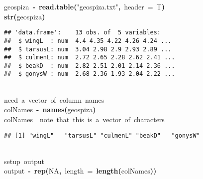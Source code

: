\documentclass{article}\usepackage{graphicx, color}
\makeatletter
\newcommand{\hlnumber}[1]{\textcolor[rgb]{0,0,0}{#1}}%
\newcommand{\hlfunctioncall}[1]{\textcolor[rgb]{0.501960784313725,0,0.329411764705882}{\textbf{#1}}}%
\newcommand{\hlstring}[1]{\textcolor[rgb]{0.6,0.6,1}{#1}}%
\newcommand{\hlkeyword}[1]{\textcolor[rgb]{0,0,0}{\textbf{#1}}}%
\newcommand{\hlargument}[1]{\textcolor[rgb]{0.690196078431373,0.250980392156863,0.0196078431372549}{#1}}%
\newcommand{\hlcomment}[1]{\textcolor[rgb]{0.180392156862745,0.6,0.341176470588235}{#1}}%
\newcommand{\hlassignement}[1]{\textcolor[rgb]{0,0,0}{\textbf{#1}}}%
\newcommand{\hlsymbol}[1]{\textcolor[rgb]{0,0,0}{#1}}%
\newcommand{\hlstd}[1]{\textcolor[rgb]{0,0,0}{#1}}%
\newenvironment{kframe}{%
 \def\FrameCommand##1{\hskip\@totalleftmargin \hskip-\fboxsep
 \colorbox{shadecolor}{##1}\hskip-\fboxsep
     \hskip-\linewidth \hskip-\@totalleftmargin \hskip\columnwidth}%
 \MakeFramed {\advance\hsize-\width
   \@totalleftmargin\z@ \linewidth\hsize
   \@setminipage}}%
 {\par\unskip\endMakeFramed}
\newenvironment{knitrout}{}{} %
\makeatother
\begin{document}
\begin{knitrout}
\color{fgcolor}\begin{kframe}
\begin{flushleft}
\ttfamily\noindent
\hlsymbol{geospiza}{\ }\hlassignement{\usebox{\hlnormalsizeboxlessthan}-}{\ }\hlfunctioncall{read.table}\hlkeyword{(}\hlstring{"{}{}geospiza.txt"{}{}}\hlkeyword{,}{\ }\hlargument{header}{\ }\hlargument{=}{\ }\hlsymbol{T}\hlkeyword{)}\hspace*{\fill}\\
\hlstd{}\hlfunctioncall{str}\hlkeyword{(}\hlsymbol{geospiza}\hlkeyword{)}\mbox{}
\normalfont
\end{flushleft}
\begin{verbatim}
## 'data.frame':	13 obs. of  5 variables:
##  $ wingL  : num  4.4 4.35 4.22 4.26 4.24 ...
##  $ tarsusL: num  3.04 2.98 2.9 2.93 2.89 ...
##  $ culmenL: num  2.72 2.65 2.28 2.62 2.41 ...
##  $ beakD  : num  2.82 2.51 2.01 2.14 2.36 ...
##  $ gonysW : num  2.68 2.36 1.93 2.04 2.22 ...
\end{verbatim}
\begin{flushleft}
\ttfamily\noindent
\hspace*{\fill}\\
\hlstd{}\hlcomment{\usebox{\hlnormalsizeboxhash}{\ }need{\ }a{\ }vector{\ }of{\ }column{\ }names}\hspace*{\fill}\\
\hlstd{}\hlsymbol{colNames}{\ }\hlassignement{\usebox{\hlnormalsizeboxlessthan}-}{\ }\hlfunctioncall{names}\hlkeyword{(}\hlsymbol{geospiza}\hlkeyword{)}\hspace*{\fill}\\
\hlstd{}\hlsymbol{colNames}{\ }{\ }\hlcomment{\usebox{\hlnormalsizeboxhash}note{\ }that{\ }this{\ }is{\ }a{\ }vector{\ }of{\ }characters}\mbox{}
\normalfont
\end{flushleft}
\begin{verbatim}
## [1] "wingL"   "tarsusL" "culmenL" "beakD"   "gonysW" 
\end{verbatim}
\begin{flushleft}
\ttfamily\noindent
\hspace*{\fill}\\
\hlstd{}\hlcomment{\usebox{\hlnormalsizeboxhash}{\ }setup{\ }output}\hspace*{\fill}\\
\hlstd{}\hlsymbol{output}{\ }\hlassignement{\usebox{\hlnormalsizeboxlessthan}-}{\ }\hlfunctioncall{rep}\hlkeyword{(}\hlnumber{NA}\hlkeyword{,}{\ }\hlargument{length}{\ }\hlargument{=}{\ }\hlfunctioncall{length}\hlkeyword{(}\hlsymbol{colNames}\hlkeyword{)}\hlkeyword{)}\hspace*{\fill}\\

\end{flushleft}
\end{kframe}
\end{knitrout}
\end{document}
